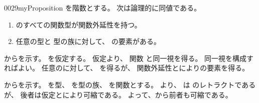 \documentclass[index]{subfiles}
\begin{document}
\begin{myBlock}{0029}{myProposition}
  を階数とする。
  次は論理的に同値である。
  \begin{enumerate}
  \item \label{0029:0000} のすべての関数型が関数外延性を持つ。
  \item \label{0029:0001} 任意の型と
    型の族に対して、
    の要素がある。
  \end{enumerate}
\end{myBlock}
\begin{myProof}
  からを示す。
  を仮定する。
  仮定より、
  関数
  と同一視を得る。
  同一視を構成すればよい。
  任意のに対して、
  を得るが、
  関数外延性とによりの要素を得る。

  からを示す。
  を型、
  を型の族、
  を関数とする。
  より、
  は
  のレトラクトであるが、
  後者は仮定とにより可縮である。
  よって、から前者も可縮である。
\end{myProof}
\end{document}
